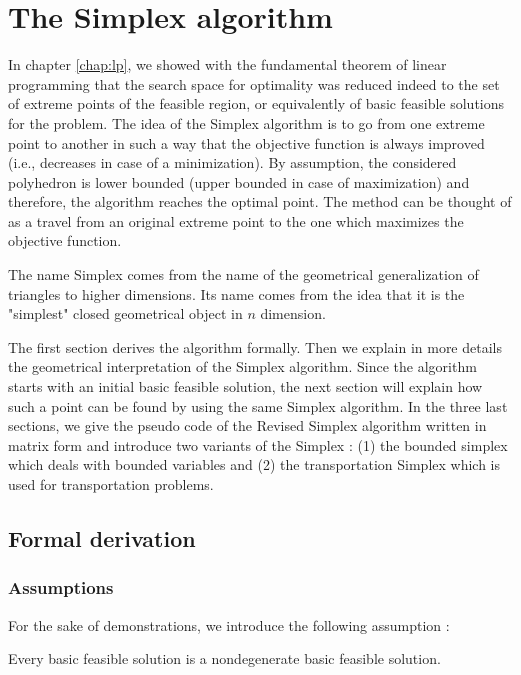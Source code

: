 \chapter{The Simplex algorithm}

In chapter \ref{chap:lp}, we showed with the fundamental theorem of linear programming that the search space for optimality was reduced indeed to the set of extreme points of the feasible region, or equivalently of basic feasible solutions for the problem. The idea of the Simplex algorithm is to go from one extreme point to another in such a way that the objective function is always improved (i.e., decreases in case of a minimization). By assumption, the considered polyhedron is lower bounded (upper bounded in case of maximization) and therefore, the algorithm reaches the optimal point. The method can be thought of as a travel from an original extreme point to the one which maximizes the objective function. 

The name Simplex comes from the name of the geometrical generalization of triangles to higher dimensions. Its name comes from the idea that it is the "simplest" closed geometrical object in $n$ dimension. 

The first section derives the algorithm formally. Then we explain in more details the geometrical interpretation of the Simplex algorithm. Since the algorithm starts with an initial basic feasible solution, the next section will explain how such a point can be found by using the same Simplex algorithm. In the three last sections, we give the pseudo code of the Revised Simplex algorithm written in matrix form and introduce two variants of the Simplex : (1) the bounded simplex which deals with bounded variables and (2) the transportation Simplex which is used for transportation problems. 

\section{Formal derivation}

\subsection{Assumptions}

For the sake of demonstrations, we introduce the following assumption : 
\begin{assumption}
    Every basic feasible solution is a nondegenerate basic
feasible solution.
\end{assumption}

